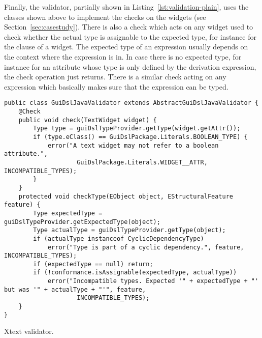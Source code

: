 Finally, the validator, partially shown in Listing~\ref{lst:validation-plain},
uses the classes shown above to implement the checks on the widgets (see
Section~\ref{sec:casestudy}).
There is also a check which acts on any widget used to check whether the actual
type is assignable to the expected type, for instance  for the
 clause of a widget. The expected type of an expression usually
depends on the context where the expression is in.
In case there is no expected type, for instance for an attribute whose type is
only defined by the derivation expression, the check operation just returns.
There is a similar check acting on any expression which basically makes sure
that the expression can be typed.

%

\begin{listing}[tb]
\begin{lstlisting} 
public class GuiDslJavaValidator extends AbstractGuiDslJavaValidator {
	@Check
	public void check(TextWidget widget) {
		Type type = guiDslTypeProvider.getType(widget.getAttr());
		if (type.eClass() == GuiDslPackage.Literals.BOOLEAN_TYPE) {
			error("A text widget may not refer to a boolean attribute.",
					GuiDslPackage.Literals.WIDGET__ATTR, INCOMPATIBLE_TYPES);
		}
	}
	protected void checkType(EObject object, EStructuralFeature feature) {
		Type expectedType = guiDslTypeProvider.getExpectedType(object);
		Type actualType = guiDslTypeProvider.getType(object);
		if (actualType instanceof CyclicDependencyType)
			error("Type is part of a cyclic dependency.", feature, INCOMPATIBLE_TYPES);
		if (expectedType == null) return;
		if (!conformance.isAssignable(expectedType, actualType))
			error("Incompatible types. Expected '" + expectedType + "' but was '" + actualType + "'", feature,
					INCOMPATIBLE_TYPES);
	}
}
\end{lstlisting}
\caption{Xtext validator.}
\label{lst:validation-plain}
\end{listing}


%

